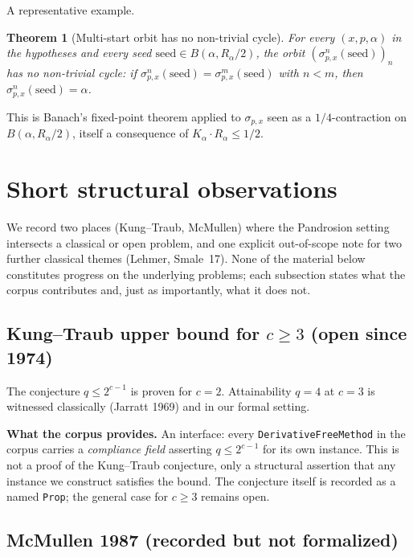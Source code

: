 \documentclass[11pt,a4paper]{article}
\newtheorem{theorem}{Theorem}[section]
\theoremstyle{definition}
\theoremstyle{remark}
\begin{document}
A representative example.

\begin{theorem}[Multi-start orbit has no non-trivial cycle]
For every $(x, p, \alpha)$ in the hypotheses and every seed
$\mathrm{seed} \in B(\alpha, R_\alpha/2)$, the orbit
$(\sigma_{p,x}^n(\mathrm{seed}))_n$ has no non-trivial cycle: if
$\sigma_{p,x}^n(\mathrm{seed}) = \sigma_{p,x}^m(\mathrm{seed})$ with
$n < m$, then $\sigma_{p,x}^n(\mathrm{seed}) = \alpha$.
\end{theorem}

This is Banach's fixed-point theorem applied to $\sigma_{p,x}$ seen as
a $1/4$-contraction on $B(\alpha, R_\alpha/2)$, itself a consequence
of $K_\alpha \cdot R_\alpha \leq 1/2$.

\section{Short structural observations}
\label{sec:open-problems}

We record two places (Kung--Traub, McMullen) where the Pandrosion
setting intersects a classical or open problem, and one explicit
out-of-scope note for two further classical themes (Lehmer,
Smale~17). None of the material below constitutes progress on the
underlying problems; each subsection states what the corpus
contributes and, just as importantly, what it does not.

\subsection{Kung--Traub upper bound for $c \geq 3$ (open since 1974)}

The conjecture $q \leq 2^{c-1}$ is proven for $c = 2$. Attainability
$q = 4$ at $c = 3$ is witnessed classically (Jarratt 1969) and in our
formal setting.

\smallskip

\textbf{What the corpus provides.} An interface: every
\texttt{DerivativeFreeMethod} in the corpus carries a
\emph{compliance field} asserting $q \leq 2^{c-1}$ for its own
instance. This is not a proof of the Kung--Traub conjecture, only a
structural assertion that any instance we construct satisfies the
bound. The conjecture itself is recorded as a named \texttt{Prop};
the general case for $c \geq 3$ remains open.

\subsection{McMullen 1987 (recorded but not formalized)}
\end{document}
